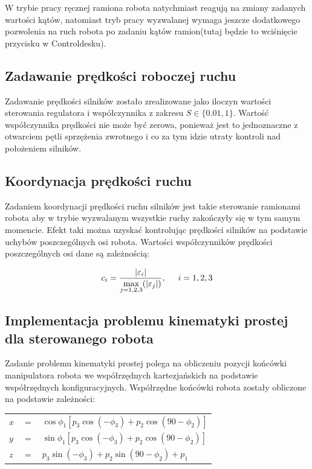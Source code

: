 \documentclass[12pt]{article}
\begin{document}
W trybie pracy ręcznej ramiona robota natychmiast reagują na zmiany zadanych
wartości kątów, natomiast tryb pracy wyzwalanej wymaga jeszcze dodatkowego
pozwolenia na ruch robota po zadaniu kątów ramion(tutaj będzie to wciśnięcie
przycisku w Controldesku).

\subsection{Zadawanie prędkości roboczej ruchu}

Zadawanie prędkości silników zostało zrealizowane jako iloczyn wartości
sterowania regulatora i współczynnika z zakresu $S \in \{0.01,1\}$. Wartość
współczynnika prędkości nie może być zerowa, ponieważ jest to jednoznaczne z
otwarciem pętli sprzężenia zwrotnego i co za tym idzie utraty kontroli nad
położeniem silników.

\subsection{Koordynacja prędkości ruchu}

Zadaniem koordynacji prędkości ruchu silników jest takie sterowanie ramionami
robota aby w trybie wyzwalanym wszystkie ruchy zakończyły się w tym samym
momencie. Efekt taki można uzyskać kontrolując prędkości silników na podstawie
uchybów poszczególnych osi robota. Wartości współczynników prędkości
poszczególnych osi dane są zależnością:

\begin{equation*}
    c_i = \dfrac{|\varepsilon_i|}{\displaystyle\max_{j=1,2,3}(|\varepsilon_j|)}
    ,\hspace{0.5cm}i=1,2,3
\end{equation*}

\subsection{Implementacja problemu kinematyki prostej dla sterowanego robota}

Zadanie problemu kinematyki prostej polega na obliczeniu pozycji końcówki
manipulatora robota we współrzędnych kartezjańskich na podstawie współrzędnych
konfiguracyjnych. Współrzędne końcówki robota zostały obliczone na podstawie
zależności:

\begin{center}
    \begin{tabular}{lll}
        $x$ & $=$ & $\cos\phi_1\left[p_3\cos(-\phi_3) +
                                     p_2\cos(90 - \phi_2)\right]$ \\[0.2cm]
        $y$ & $=$ & $\sin\phi_1\left[p_3\cos(-\phi_3) +
                                     p_2\cos(90 - \phi_2)\right]$ \\[0.2cm]
        $z$ & $=$ & $p_3\sin(-\phi_3) + p_2\sin(90 - \phi_2) + p_1$
    \end{tabular}
\end{center}
\end{document}
